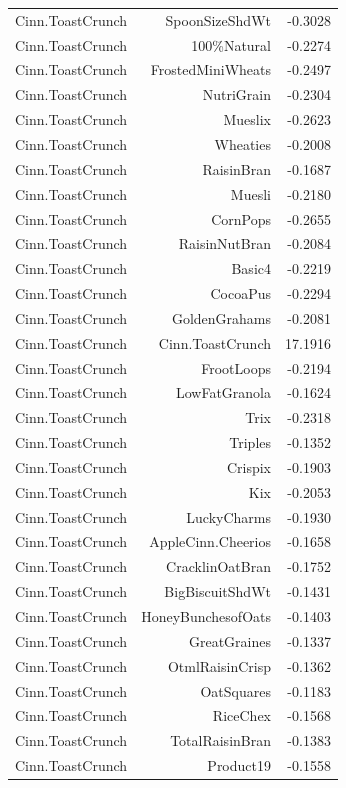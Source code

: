 \begin{longtable}{@{}lrr@{}}
Cinn.ToastCrunch & SpoonSizeShdWt & -0.3028 \\
Cinn.ToastCrunch & 100\%Natural & -0.2274 \\
Cinn.ToastCrunch & FrostedMiniWheats & -0.2497 \\
Cinn.ToastCrunch & NutriGrain & -0.2304 \\
Cinn.ToastCrunch & Mueslix & -0.2623 \\
Cinn.ToastCrunch & Wheaties & -0.2008 \\
Cinn.ToastCrunch & RaisinBran & -0.1687 \\
Cinn.ToastCrunch & Muesli & -0.2180 \\
Cinn.ToastCrunch & CornPops & -0.2655 \\
Cinn.ToastCrunch & RaisinNutBran & -0.2084 \\
Cinn.ToastCrunch & Basic4 & -0.2219 \\
Cinn.ToastCrunch & CocoaPus & -0.2294 \\
Cinn.ToastCrunch & GoldenGrahams & -0.2081 \\
Cinn.ToastCrunch & Cinn.ToastCrunch & 17.1916 \\
Cinn.ToastCrunch & FrootLoops & -0.2194 \\
Cinn.ToastCrunch & LowFatGranola & -0.1624 \\
Cinn.ToastCrunch & Trix & -0.2318 \\
Cinn.ToastCrunch & Triples & -0.1352 \\
Cinn.ToastCrunch & Crispix & -0.1903 \\
Cinn.ToastCrunch & Kix & -0.2053 \\
Cinn.ToastCrunch & LuckyCharms & -0.1930 \\
Cinn.ToastCrunch & AppleCinn.Cheerios & -0.1658 \\
Cinn.ToastCrunch & CracklinOatBran & -0.1752 \\
Cinn.ToastCrunch & BigBiscuitShdWt & -0.1431 \\
Cinn.ToastCrunch & HoneyBunchesofOats & -0.1403 \\
Cinn.ToastCrunch & GreatGraines & -0.1337 \\
Cinn.ToastCrunch & OtmlRaisinCrisp & -0.1362 \\
Cinn.ToastCrunch & OatSquares & -0.1183 \\
Cinn.ToastCrunch & RiceChex & -0.1568 \\
Cinn.ToastCrunch & TotalRaisinBran & -0.1383 \\
Cinn.ToastCrunch & Product19 & -0.1558 \\

\end{longtable}
